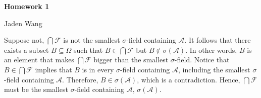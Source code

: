 \documentclass[12pt]{article}
\begin{document}
\centerline {\textsf{\textbf{\LARGE{Homework 1}}}}
\centerline {Jaden Wang}

\begin{problem}[1]
	Suppose not, $\bigcap \mathcal{F} $ is not the smallest  $\sigma$-field containing $\mathcal{A}$. It follows that there exists a subset $B \subseteq \Omega$ such that $B \in \bigcap \mathcal{F} $ but $B \not \in \sigma(\mathcal{A})$. In other words, $B$ is an element that makes  $\bigcap \mathcal{F}$ bigger than the smallest $\sigma$-field. Notice that $B \in \bigcap \mathcal{F} $ implies that $B$ is in every  $\sigma$-field containing $\mathcal{A}$, including the smallest $\sigma$-field containing $\mathcal{A}$. Therefore, $B \in \sigma(\mathcal{A})$, which is a contradiction. Hence, $\bigcap \mathcal{F} $ must be the smallest  $\sigma$-field containing $\mathcal{A}$, $\sigma(\mathcal{A})$.
\end{problem}
\end{document}
